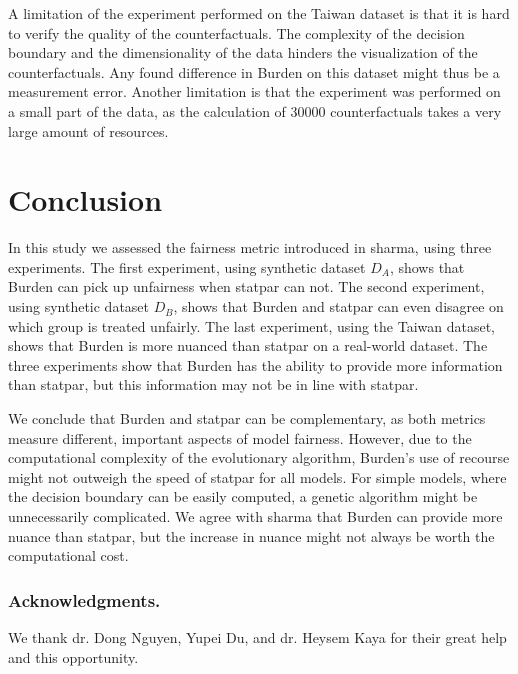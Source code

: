 \documentclass[runningheads]{llncs}
\begin{document}
A limitation of the experiment performed on the Taiwan dataset is that it is hard to verify the quality of the counterfactuals. The complexity of the decision boundary and the dimensionality of the data hinders the visualization of the counterfactuals. Any found difference in \gls{Burden} on this dataset might thus be a measurement error. Another limitation is that the experiment was performed on a small part of the data, as the calculation of 30000 counterfactuals takes a very large amount of resources. 


\section{Conclusion}\label{sec:conclusion}
In this study we assessed the fairness metric introduced in \gls{sharma}, using three experiments.
The first experiment, using synthetic dataset $D_A$, shows that \gls{Burden} can pick up unfairness when \gls{statpar} can not. The second experiment, using synthetic dataset $D_B$, shows that \gls{Burden} and \gls{statpar} can even disagree on which group is treated unfairly. The last experiment, using the Taiwan dataset, shows that \gls{Burden} is more nuanced than \gls{statpar} on a real-world dataset. The three experiments show that \gls{Burden} has the ability to provide more information than \gls{statpar}, but this information may not be in line with \gls{statpar}.

We conclude that \gls{Burden} and \gls{statpar} can be complementary, as both metrics measure different, important aspects of model fairness. However, due to the computational complexity of the evolutionary algorithm, \gls{Burden}'s use of recourse might not outweigh the speed of \gls{statpar} for all models. For simple models, where the decision boundary can be easily computed, a genetic algorithm might be unnecessarily complicated. We agree with \gls{sharma} that \gls{Burden} can provide more nuance than \gls{statpar}, but the increase in nuance might not always be worth the computational cost.

\subsubsection*{Acknowledgments.} We thank dr. Dong Nguyen, Yupei Du, and dr. Heysem Kaya for their great help and this opportunity.



\end{document}
